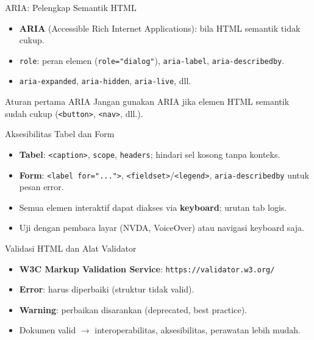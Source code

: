\documentclass[handout]{beamer}
\begin{document}
\begin{frame}{ARIA: Pelengkap Semantik HTML}
	\begin{itemize}
		\item \textbf{ARIA} (Accessible Rich Internet Applications): bila HTML semantik tidak cukup.
		\item \texttt{role}: peran elemen (\texttt{role="dialog"}), \texttt{aria-label}, \texttt{aria-describedby}.
		\item \texttt{aria-expanded}, \texttt{aria-hidden}, \texttt{aria-live}, dll.
	\end{itemize}
	\begin{block}{Aturan pertama ARIA}
		Jangan gunakan ARIA jika elemen HTML semantik sudah cukup (\texttt{<button>}, \texttt{<nav>}, dll.).
	\end{block}
\end{frame}

\begin{frame}{Aksesibilitas Tabel dan Form}
	\begin{itemize}
		\item \textbf{Tabel}: \texttt{<caption>}, \texttt{scope}, \texttt{headers}; hindari sel kosong tanpa konteks.
		\item \textbf{Form}: \texttt{<label for="...">}, \texttt{<fieldset>}/\texttt{<legend>}, \texttt{aria-describedby} untuk pesan error.
		\item Semua elemen interaktif dapat diakses via \textbf{keyboard}; urutan tab logis.
		\item Uji dengan pembaca layar (NVDA, VoiceOver) atau navigasi keyboard saja.
	\end{itemize}
\end{frame}

\begin{frame}{Validasi HTML dan Alat Validator}
	\begin{itemize}
		\item \textbf{W3C Markup Validation Service}: \texttt{https://validator.w3.org/}
		\item \textbf{Error}: harus diperbaiki (struktur tidak valid).
		\item \textbf{Warning}: perbaikan disarankan (deprecated, best practice).
		\item Dokumen valid $\to$ interoperabilitas, aksesibilitas, perawatan lebih mudah.
	\end{itemize}
\end{frame}
\end{document}
